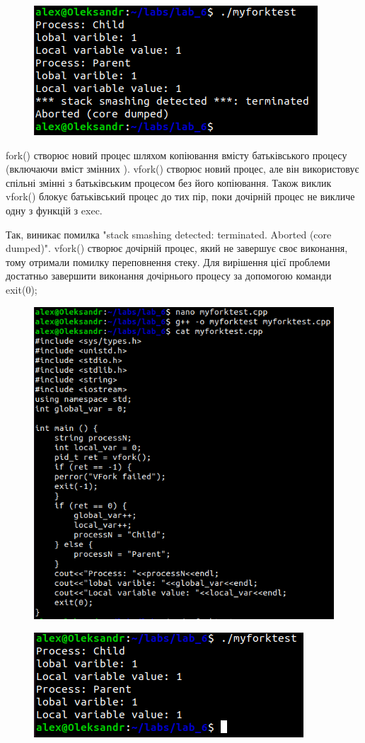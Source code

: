\documentclass[a4paper,12pt]{article}
\begin{document}
\newpage
    \begin{figure}[h!]
        \begin{minipage}[h]{1\linewidth}
            \centering
            \includegraphics[width=0.6\linewidth]{Prt sc/Figure_6_2.png}  
        \end{minipage}
    \end{figure}
    fork() створює новий процес шляхом копіювання вмісту батьківського процесу (включаючи вміст змінних ). 
    vfork() створює новий процес, але він використовує спільні змінні з батьківським процесом без його копіювання.
    Також виклик vfork() блокує батьківський процес до тих пір, поки дочірній процес не викличе одну з функцій з exec.

    Так, виникає помилка "stack smashing detected: terminated. Aborted (core dumped)". 
    vfork() створює дочірній процес, який не завершує своє виконання, тому отримали помилку переповнення стеку.
    Для вирішення цієї проблеми достатньо завершити виконання дочірнього процесу за допомогою команди exit(0);
    \begin{figure}[h!]
        \begin{minipage}[h]{1\linewidth}
            \centering
            \includegraphics[width=0.5\linewidth]{Prt sc/Figure_6_3.png}  
        \end{minipage}
    \end{figure}
    \begin{figure}[h!]
        \begin{minipage}[h]{1\linewidth}
            \centering
            \includegraphics[width=0.5\linewidth]{Prt sc/Figure_6_4.png}  
        \end{minipage}
    \end{figure} 
\end{document}
